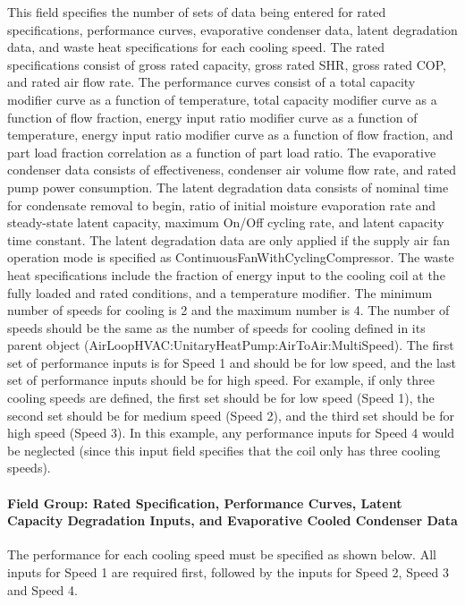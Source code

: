 This field specifies the number of sets of data being entered for rated specifications, performance curves, evaporative condenser data, latent degradation data, and waste heat specifications for each cooling speed. The rated specifications consist of gross rated capacity, gross rated SHR, gross rated COP, and rated air flow rate. The performance curves consist of a total capacity modifier curve as a function of temperature, total capacity modifier curve as a function of flow fraction, energy input ratio modifier curve as a function of temperature, energy input ratio modifier curve as a function of flow fraction, and part load fraction correlation as a function of part load ratio. The evaporative condenser data consists of effectiveness, condenser air volume flow rate, and rated pump power consumption. The latent degradation data consists of nominal time for condensate removal to begin, ratio of initial moisture evaporation rate and steady-state latent capacity, maximum On/Off cycling rate, and latent capacity time constant. The latent degradation data are only applied if the supply air fan operation mode is specified as ContinuousFanWithCyclingCompressor. The waste heat specifications include the fraction of energy input to the cooling coil at the fully loaded and rated conditions, and a temperature modifier. The minimum number of speeds for cooling is 2 and the maximum number is 4. The number of speeds should be the same as the number of speeds for cooling defined in its parent object (AirLoopHVAC:UnitaryHeatPump:AirToAir:MultiSpeed). The first set of performance inputs is for Speed 1 and should be for low speed, and the last set of performance inputs should be for high speed. For example, if only three cooling speeds are defined, the first set should be for low speed (Speed 1), the second set should be for medium speed (Speed 2), and the third set should be for high speed (Speed 3). In this example, any performance inputs for Speed 4 would be neglected (since this input field specifies that the coil only has three cooling speeds).

\paragraph{Field Group: Rated Specification, Performance Curves, Latent Capacity Degradation Inputs, and Evaporative Cooled Condenser Data}\label{field-group-rated-specification-performance-curves-latent-capacity-degradation-inputs-and-evaporative-cooled-condenser-data}

The performance for each cooling speed must be specified as shown below. All inputs for Speed 1 are required first, followed by the inputs for Speed 2, Speed 3 and Speed 4.

